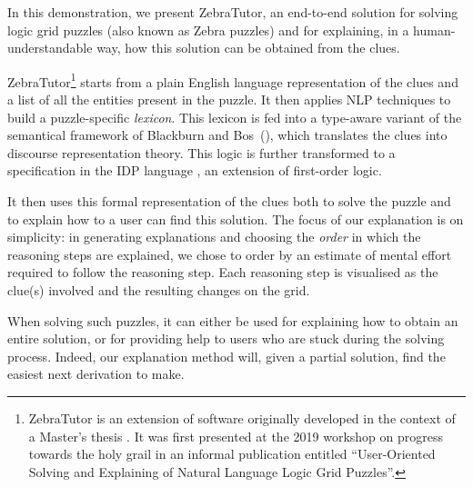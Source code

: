 \documentclass[runningheads]{llncs}
\newcommand{\zebratutor}{ZebraTutor\xspace}
\newcommand{\ourtool}{\zebratutor}
\newcommand{\idp}{IDP\xspace}
\newcommand{\minisatid}{MiniSAT(ID)\xspace}
\newcommand{\mycite}[1]{\cite{#1}}
\begin{document}
In this demonstration, we present \ourtool,  an end-to-end solution for solving logic grid puzzles (also known as Zebra puzzles) and for explaining, in a human-understandable way, how this solution can be obtained from the clues. 

\ourtool\footnote{\ourtool is an extension of software originally developed in the context of a Master's thesis \cite{msc/Claes17}. It was first presented at the 2019 workshop on progress towards the holy grail in an informal publication entitled ``User-Oriented Solving and Explaining of Natural Language Logic Grid Puzzles''. } starts from a plain English language representation of the clues and a list of all the entities present in the puzzle. It then applies NLP techniques to build a puzzle-specific \textit{lexicon}. This lexicon is fed into a type-aware variant of the semantical framework of Blackburn and Bos~(\cite{Blackburn2005,Blackburn2006}), which translates the clues into discourse representation theory. This logic is further transformed to a specification in the \idp language \mycite{WarrenBook/DeCatBBD14}, an extension of first-order logic. 

It then uses this formal representation of the clues both to solve the puzzle and to explain how to a user can find this solution. 
The focus of our explanation is on simplicity: 
in generating explanations and choosing the \textit{order} in which the reasoning steps are explained, we chose to order by an estimate of mental effort required to follow the reasoning step. Each reasoning step is visualised as the clue(s) involved and the resulting changes on the grid.

When solving such puzzles, it can either be used for explaining how to obtain an entire solution, or for providing help to users who are stuck during the solving process. Indeed, our explanation method will, given a partial solution, find the easiest next derivation to make. 
\end{document}
